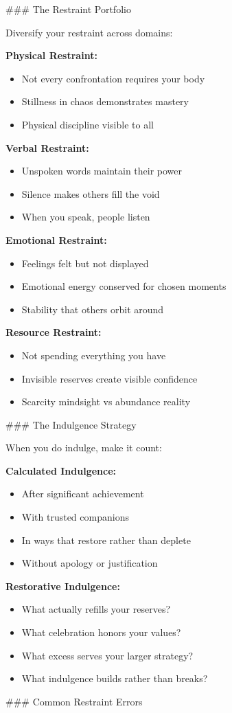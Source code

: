 \documentclass[12pt]{book}
\begin{document}
\#\#\# The Restraint Portfolio

Diversify your restraint across domains:

\textbf{Physical Restraint:}
\begin{itemize}
\item Not every confrontation requires your body
\item Stillness in chaos demonstrates mastery
\item Physical discipline visible to all

\end{itemize}
\textbf{Verbal Restraint:}
\begin{itemize}
\item Unspoken words maintain their power
\item Silence makes others fill the void
\item When you speak, people listen

\end{itemize}
\textbf{Emotional Restraint:}
\begin{itemize}
\item Feelings felt but not displayed
\item Emotional energy conserved for chosen moments
\item Stability that others orbit around

\end{itemize}
\textbf{Resource Restraint:}
\begin{itemize}
\item Not spending everything you have
\item Invisible reserves create visible confidence
\item Scarcity mindsight vs abundance reality

\end{itemize}
\#\#\# The Indulgence Strategy

When you do indulge, make it count:

\textbf{Calculated Indulgence:}
\begin{itemize}
\item After significant achievement
\item With trusted companions
\item In ways that restore rather than deplete
\item Without apology or justification

\end{itemize}
\textbf{Restorative Indulgence:}
\begin{itemize}
\item What actually refills your reserves?
\item What celebration honors your values?
\item What excess serves your larger strategy?
\item What indulgence builds rather than breaks?

\end{itemize}
\#\#\# Common Restraint Errors
\end{document}
